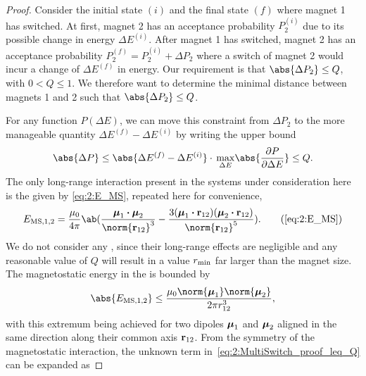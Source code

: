 \begin{proof}
	Consider the initial state $(i)$ and the final state $(f)$ where magnet 1 has switched.
	At first, magnet 2 has an acceptance probability $P_2^{(i)}$ due to its possible change in energy $\Delta E^{(i)}$.
	After magnet 1 has switched, magnet 2 has an acceptance probability $P_2^{(f)} = P_2^{(i)} + \Delta P_2$ where a switch of magnet 2 would incur a change of $\Delta E^{(f)}$ in energy.
	Our requirement is that $\abs{\Delta P_2} \leq Q$, with $0 < Q \leq 1$.
	We therefore want to determine the minimal distance between magnets 1 and 2 such that $\abs{\Delta P_2} \leq Q$. \par
	For any function $P(\Delta E)$, we can move this constraint from $\Delta P_2$ to the more manageable quantity $\Delta E^{(f)} - \Delta E^{(i)}$ by writing the upper bound
	\begin{equation}
		\label{eq:2:MultiSwitch_proof_leq_Q}
		\abs{\Delta P} \leq \abs{\Delta E^{(f)} - \Delta E^{(i)}} \cdot \, \underset{\Delta E}{\max} \abs{\frac{\partial P}{\partial \Delta E}} \leq Q \mathrm{.}
	\end{equation}
	The only long-range interaction present in the systems under consideration here is the  given by \eqref{eq:2:E_MS}, repeated here for convenience,
	\begin{equation*}
		E_{\mathrm{MS},1,2} = \frac{\mu_0}{4 \pi} \ab(\frac{\vc{\mu}_1 \bcdot \vc{\mu}_2}{\norm{\vc{r}_{12}}^3} - \frac{3(\vc{\mu}_1 \bcdot \vc{r}_{12}) (\vc{\mu}_2 \bcdot \vc{r}_{12})}{\norm{\vc{r}_{12}}^5}) \mathrm{.}  \tag{\ref*{eq:2:E_MS}}
	\end{equation*}
	We do not consider any , since their long-range effects are negligible and any reasonable value of $Q$ will result in a value $r_\mathrm{min}$ far larger than the magnet size.
	The magnetostatic energy in the  is bounded by
	\begin{equation}
		\label{eq:2:MultiSwitch_proof_EMS_leq}
		\abs{E_{\mathrm{MS},1,2}} \leq \frac{\mu_0 \norm{\vc{\mu}_1} \norm{\vc{\mu}_2}}{2 \pi r_{12}^3} \mathrm{,}
	\end{equation}
	with this extremum being achieved for two dipoles $\boldsymbol{\mathbf{\mu}}_1$ and $\boldsymbol{\mathbf{\mu}}_2$ aligned in the same direction along their common axis $\boldsymbol{\mathbf{r}}_{12}$.
	From the symmetry of the magnetostatic interaction, %
	the unknown term in~\cref{eq:2:MultiSwitch_proof_leq_Q} can be expanded as 

\end{proof}
